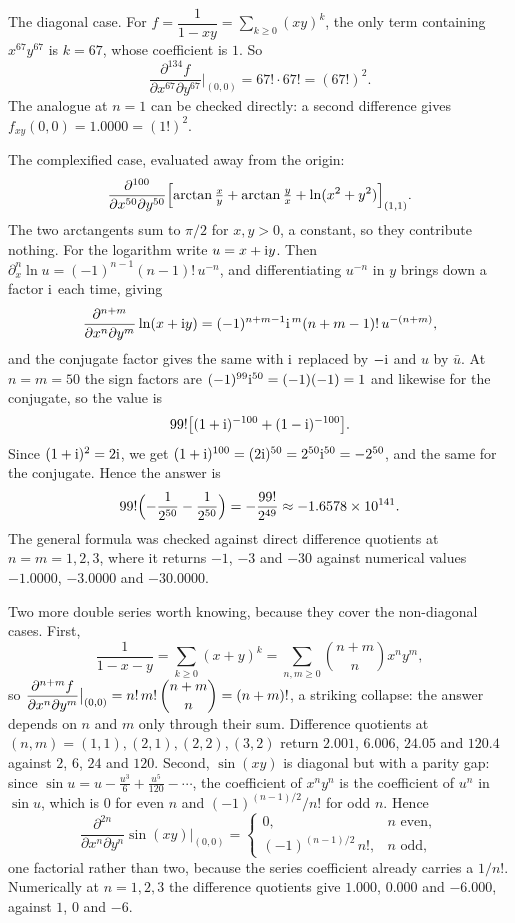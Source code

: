 \begin{worked}
The diagonal case. For $f=\dfrac{1}{1-xy}=\sum_{k\geq0}(xy)^{k}$, the only term containing $x^{67}y^{67}$ is $k=67$, whose coefficient is $1$. So
\[
\frac{\partial^{134}f}{\partial x^{67}\partial y^{67}}\Big|_{(0,0)}=67!\cdot67!=(67!)^{2}.
\]
The analogue at $n=1$ can be checked directly: a second difference gives $f_{xy}(0,0)=1.0000=(1!)^{2}$.

The complexified case, evaluated away from the origin:
\[
\frac{\partial^{100}}{\partial x^{50}\partial y^{50}}\Bigl[\arctan\tfrac xy+\arctan\tfrac yx+\ln(x^{2}+y^{2})\Bigr]_{(1,1)} .
\]
The two arctangents sum to $\pi/2$ for $x,y>0$, a constant, so they contribute nothing. For the logarithm write $u=x+\mathrm{i} y$. Then $\partial_{x}^{n}\ln u=(-1)^{n-1}(n-1)!\,u^{-n}$, and differentiating $u^{-n}$ in $y$ brings down a factor $\mathrm{i}$ each time, giving
\[
\frac{\partial^{n+m}}{\partial x^{n}\partial y^{m}}\ln(x+\mathrm{i} y)=(-1)^{n+m-1}\mathrm{i}^{\,m}(n+m-1)!\,u^{-(n+m)} ,
\]
and the conjugate factor gives the same with $\mathrm{i}$ replaced by $-\mathrm{i}$ and $u$ by $\bar u$. At $n=m=50$ the sign factors are $(-1)^{99}\mathrm{i}^{50}=(-1)(-1)=1$ and likewise for the conjugate, so the value is
\[
99!\bigl[(1+\mathrm{i})^{-100}+(1-\mathrm{i})^{-100}\bigr].
\]
Since $(1+\mathrm{i})^{2}=2\mathrm{i}$, we get $(1+\mathrm{i})^{100}=(2\mathrm{i})^{50}=2^{50}\mathrm{i}^{50}=-2^{50}$, and the same for the conjugate. Hence the answer is
\[
99!\Bigl(-\frac{1}{2^{50}}-\frac{1}{2^{50}}\Bigr)=-\frac{99!}{2^{49}}\approx-1.6578\times10^{141}.
\]
The general formula was checked against direct difference quotients at $n=m=1,2,3$, where it returns $-1$, $-3$ and $-30$ against numerical values $-1.0000$, $-3.0000$ and $-30.0000$.

Two more double series worth knowing, because they cover the non-diagonal cases. First,
\[
\frac{1}{1-x-y}=\sum_{k\geq0}(x+y)^{k}=\sum_{n,m\geq0}\binom{n+m}{n}x^{n}y^{m},
\]
so $\dfrac{\partial^{n+m}f}{\partial x^{n}\partial y^{m}}\big|_{(0,0)}=n!\,m!\,\dbinom{n+m}{n}=(n+m)!$, a striking collapse: the answer depends on $n$ and $m$ only through their sum. Difference quotients at $(n,m)=(1,1),(2,1),(2,2),(3,2)$ return $2.001$, $6.006$, $24.05$ and $120.4$ against $2$, $6$, $24$ and $120$. Second, $\sin(xy)$ is diagonal but with a parity gap: since $\sin u=u-\tfrac{u^{3}}{6}+\tfrac{u^{5}}{120}-\cdots$, the coefficient of $x^{n}y^{n}$ is the coefficient of $u^{n}$ in $\sin u$, which is $0$ for even $n$ and $(-1)^{(n-1)/2}/n!$ for odd $n$. Hence
\[
\frac{\partial^{2n}}{\partial x^{n}\partial y^{n}}\sin(xy)\Big|_{(0,0)}=
\begin{cases}
0, & n \text{ even},\\[2pt]
(-1)^{(n-1)/2}\,n!, & n \text{ odd},
\end{cases}
\]
one factorial rather than two, because the series coefficient already carries a $1/n!$. Numerically at $n=1,2,3$ the difference quotients give $1.000$, $0.000$ and $-6.000$, against $1$, $0$ and $-6$.
\end{worked}


